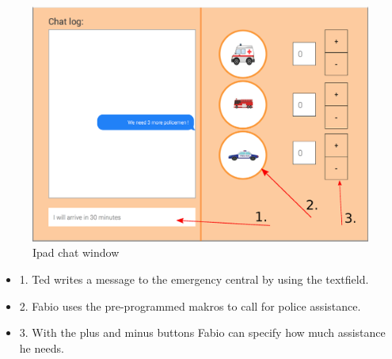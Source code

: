 \begin{minipage}{0.72\textwidth}
\begin{figure}[H]
\caption{Ipad chat window}
\includegraphics[width=1.0\textwidth]{Ipad_Messages.eps}
\end{figure}
\end{minipage} \hfill
\begin{minipage}{0.23\textwidth}
\begin{itemize}
\item 1. Ted writes a message to the emergency central by using the textfield.
\item 2. Fabio uses the pre-programmed makros to call for police assistance.
\item 3. With the plus and minus buttons Fabio can specify how much
assistance he needs.
\end{itemize}
\end{minipage}

